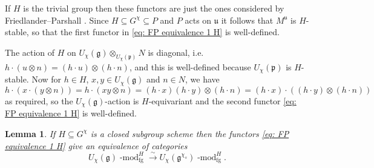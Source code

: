 \documentclass[twoside,12pt,reqno]{amsart}
\newtheorem{Lemma}[Theorem]{Lemma}
\theoremstyle{remark}
\numberwithin{equation}{section}
\def\isoto{\overset{\sim}{\longrightarrow}}
\def\lmod{\!\operatorname{-mod}}
\def\g{{\mathfrak g}}
\def\p{\mathfrak p}
\def\u{\mathfrak{u}}
\newcommand{\fg}{\operatorname{fg}}
\begin{document}
If $H$ is the trivial group then these functors are just the ones considered by Friedlander--Parshall \cite{FP}. Since $H \subseteq G^\chi \subseteq P$ and $P$ acts on $\u$ it follows that $M^\u$ is $H$-stable, so that the first functor in \eqref{eq: FP equivalence 1 H} is well-defined.

The action of $H$ on $U_\chi(\g) \otimes_{U_\chi(\mathfrak{p})} N$ is diagonal, i.e. $h\cdot (u \otimes n) = (h\cdot u) \otimes (h\cdot n)$, and this is well-defined because $U_\chi(\p)$ is $H$-stable. Now for $h\in H$, $x, y \in U_\chi(\g)$ and $n\in N$, we have
\[
    h \cdot (x \cdot (y \otimes n)) = h \cdot (xy \otimes n) = (h \cdot x)(h \cdot y) \otimes (h \cdot n) = (h \cdot x) \cdot ((h \cdot y) \otimes (h \cdot n))
\]
as required, so the $U_\chi(\g)$-action is $H$-equivariant and the second functor \eqref{eq: FP equivalence 1 H} is well-defined.

\begin{Lemma} \label{thm: FP equivalence}
    If $H \subseteq G^\chi$ is a closed subgroup scheme then the functors \eqref{eq: FP equivalence 1 H} give an equivalence of categories
    \begin{equation}
        U_\chi(\g)\lmod^H_{\fg} \isoto U_\chi(\g^{\chi_s})\lmod^H_{\fg}.
    \end{equation}
\end{Lemma}
\end{document}
